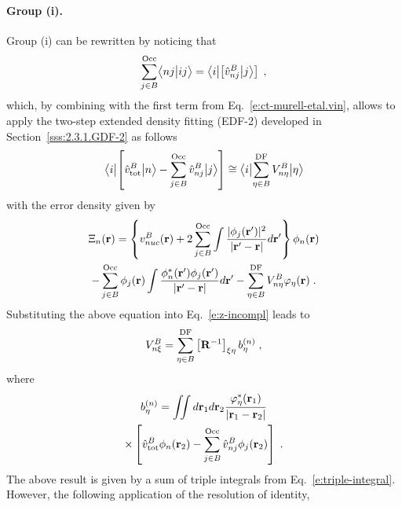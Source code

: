 \documentclass[aip,jcp,amsmath,amssymb,reprint,floatfix]{revtex4-1}
\begin{document}
\paragraph{Group (i).}
Group (i) can be rewritten by noticing that
%
\begin{equation} \label{e:ct-murell-etal.group-i.notice}
 \sum_{j\in B}^{\rm Occ} 
 \BraKet{nj}{ij} =
 \Bra{i} \left[ \hat{v}^B_{nj} \Ket{j} \right]  \;,
\end{equation}
%
which, by combining with the first term from Eq.~\eqref{e:ct-murell-etal.vin}, 
allows to apply the two\hyp{}step extended density fitting (EDF-2) 
developed in Section~\ref{sss:2.3.1.GDF-2} as follows
%
\begin{equation} \label{e:v-oep.ct}
\Bra{i} \left[ \hat{v}^B_{\rm tot} \Ket{n} - \sum_{j\in B}^{\rm Occ} \hat{v}^B_{nj} \Ket{j} \right]
\cong \Bra{i} \sum_{\eta\in B}^{\rm DF} V^B_{n\eta} \Ket{\eta}
\end{equation}
%
with the error density given by
%
\begin{multline}
 \Xi_n({\bf r}) = 
  \left\{
      v_{nuc}^B({\bf r}) + 2 \sum_{j\in B}^{\rm Occ}
   \int \frac{ \vert \phi_j({\bf r}') \vert^2 }{\vert {\bf r}' - {\bf r} \vert} d{\bf r}'
  \right\}
  \phi_n({{\bf r}})  \\
 - \sum_{j\in B}^{\rm Occ} \phi_j({{\bf r}})
   \int \frac{ \phi^*_n({\bf r}') \phi_j({{\bf r}'}) }{\vert {\bf r}' - {\bf r} \vert} d{\bf r}'
 - \sum_{\eta\in B}^{\rm DF} V^B_{n\eta} \varphi_\eta({\bf r}) \;.
\end{multline}
%
Substituting the above equation into Eq.~\eqref{e:z-incompl}
leads to
%
\begin{equation} \label{e:v-oep-group-1-prefinal}
 V^B_{n\xi} = \sum_{\eta\in B}^{\rm DF} \left[ {\bf R}^{-1} \right]_{\xi\eta} b_\eta^{(n)} \;,
\end{equation}
%
where
%
\begin{multline}
 b^{(n)}_\eta = \iint 
           d{\bf r}_1 d{\bf r}_2  
           \frac{ \varphi^*_\eta({\bf r}_1) }
            {\vert {\bf r}_1 - {\bf r}_2 \vert } \\ \times
          \left[ 
           \hat{v}^B_{\rm tot}  \phi_n({\bf r}_2) 
         - \sum_{j\in B}^{\rm Occ} \hat{v}^B_{nj} \phi_j({{\bf r}_2})
           \right]  \;.
\end{multline}
%
The above result is given by a sum of triple integrals from Eq.~\eqref{e:triple-integral}.
However, the following application of the resolution of identity,
\end{document}

